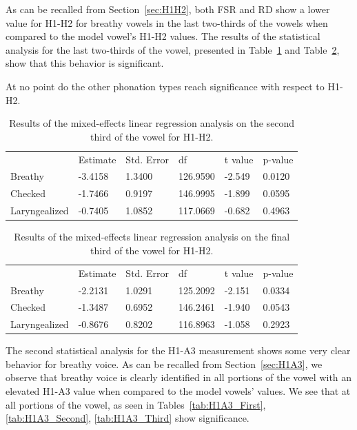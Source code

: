 \documentclass[12pt, letterpaper]{article}
\providecommand{\lsptoprule}{\midrule\toprule}
\providecommand{\lspbottomrule}{\bottomrule\midrule}
\begin{document}
As can be recalled from Section~\ref{sec:H1H2}, both FSR and RD show a lower value for H1-H2 for breathy vowels in the last two-thirds of the vowels when compared to the model vowel's H1-H2 values. The results of the statistical analysis for the last two-thirds of the vowel, presented in Table~\ref{tab:H1H2_Second} and Table~\ref{tab:H1H2_Third}, show that this behavior is significant.

At no point do the other phonation types reach significance with respect to H1-H2. 

\begin{table}[!h]
	\centering
	\caption{Results of the mixed-effects linear regression analysis on the second third of the vowel for H1-H2. }
	\label{tab:H1H2_Second}
	 \begin{tabular}{llllll}
	  \lsptoprule
						&  Estimate  & Std. Error & df & t value & p-value \\
	  	Breathy   		&  -3.4158  &   1.3400 & 126.9590 &  -2.549  &  0.0120 \\
		Checked    		&  -1.7466  &   0.9197 & 146.9995 &  -1.899  &  0.0595 \\
		Laryngealized	&  -0.7405  &   1.0852 & 117.0669 &  -0.682  &  0.4963 \\
	  \lspbottomrule
	 \end{tabular}
\end{table}

\begin{table}[!h]
	\centering
	\caption{Results of the mixed-effects linear regression analysis on the final third of the vowel for H1-H2. }
	\label{tab:H1H2_Third}
	 \begin{tabular}{llllll}
	  \lsptoprule
						&  Estimate  & Std. Error & df & t value & p-value \\
	  	Breathy   		&  -2.2131  &   1.0291 & 125.2092 &  -2.151  &  0.0334 \\
		Checked    		&  -1.3487  &   0.6952 & 146.2461 &  -1.940  &  0.0543 \\
		Laryngealized	&  -0.8676  &   0.8202 & 116.8963 &  -1.058  &  0.2923 \\
	  \lspbottomrule
	 \end{tabular}
\end{table}

The second statistical analysis for the H1-A3 measurement shows some very clear behavior for breathy voice. As can be recalled from Section~\ref{sec:H1A3}, we observe that breathy voice is clearly identified in all portions of the vowel with an elevated H1-A3 value when compared to the model vowels' values. We see that at all portions of the vowel, as seen in Tables~\ref{tab:H1A3_First}, \ref{tab:H1A3_Second}, \ref{tab:H1A3_Third} show significance.  
\end{document}
